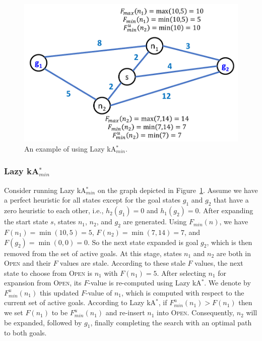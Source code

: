 \documentclass{aicom2e}
\newcommand{\kastar}{kA$^*$}
\newcommand{\kastarmin}{kA$^*_{min}$}
\newcommand{\minf}{$F_{min}(n)$}
\newcommand{\open}{\textsc{Open}}
\newcommand{\roni}[1]{\textbf{[RS:#1]}}
\begin{document}




\begin{figure}
    \includegraphics[width=\columnwidth]{Lazy_cropped_cropped.pdf}
    \caption{An example of using Lazy \kastarmin{}.}
    \label{fig:lazy}
\end{figure}



\subsubsection{Lazy \kastarmin{}}

Consider running Lazy \kastarmin{} on the graph depicted in
Figure~\ref{fig:lazy}. Assume we have a perfect heuristic for all states except
for the goal states $g_1$ and $g_2$ that have a zero heuristic to each other,
i.e., $h_2(g_1)=0$ and $h_1(g_2)=0$. 
After expanding the start state $s$, states $n_1$, $n_2$, and
$g_2$ are generated. Using \minf{}, we have $F(n_1)=\min(10,5)=5$,
$F(n_2)=\min(7,14)=7$, and $F(g_2)=\min(0,0)=0$. So the next state expanded is
goal $g_2$, which is then removed from the set of active goals. At this stage,
states $n_1$ and $n_2$ are both in \open{} and their $F$ values are stale.
According to these stale $F$ values, the next state to
choose from \open{} is $n_1$ with $F(n_1)=5$. After selecting $n_1$ for expansion from
\open{}, its $F$-value is re-computed using Lazy \kastar{}. We denote
by $F^u_{min}(n_1)$ this updated $F$-value of $n_1$, which is computed with respect
to the current set of active goals. According to Lazy \kastar{}, if
$F^u_{min}(n_1)> F(n_1)$ then we set $F(n_1)$ to be $F^u_{min}(n_1)$ and re-insert
$n_1$ into \open{}. Consequently, $n_2$ will be expanded, followed by $g_1$,
finally completing the search with an optimal path to both goals. %
\end{document}
